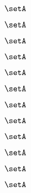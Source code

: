 \begin{forslides}
    \begin{equation}
        \label{eq:slides-translation-115}
        \setA
    \end{equation}

    \begin{equation}
        \label{eq:slides-translation-116}
        \setA
    \end{equation}

    \begin{equation}
        \label{eq:slides-translation-117}
        \setA
    \end{equation}

    \begin{equation}
        \label{eq:slides-translation-118}
        \setA
    \end{equation}

    \begin{equation}
        \label{eq:slides-translation-119}
        \setA
    \end{equation}

    \begin{equation}
        \label{eq:slides-translation-120}
        \setA
    \end{equation}

    \begin{equation}
        \label{eq:slides-translation-121}
        \setA
    \end{equation}

    \begin{equation}
        \label{eq:slides-translation-122}
        \setA
    \end{equation}

    \begin{equation}
        \label{eq:slides-translation-123}
        \setA
    \end{equation}

    \begin{equation}
        \label{eq:slides-translation-124}
        \setA
    \end{equation}

    \begin{equation}
        \label{eq:slides-translation-125}
        \setA
    \end{equation}

    \begin{equation}
        \label{eq:slides-translation-126}
        \setA
    \end{equation}


\end{forslides}
